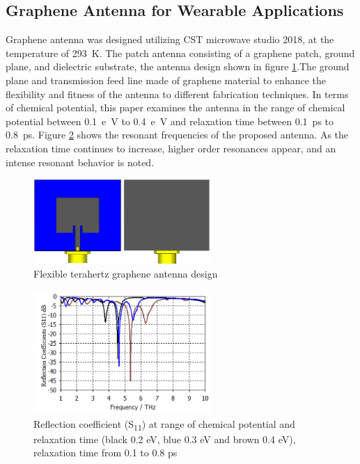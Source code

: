 \documentclass[12pt]{suhbook}
\begin{document}
\subsection{Graphene Antenna for Wearable Applications}
Graphene antenna was designed utilizing CST microwave studio \si{2018}, at the temperature of \SI{293}{\kelvin}. The patch antenna consisting of a graphene patch, ground plane, and dielectric substrate, the antenna design shown in figure \ref{Fig 1}.The ground plane and transmission feed line made of graphene material to enhance the flexibility and fitness of the antenna to different fabrication techniques. In terms of chemical potential, this paper examines the antenna in the range of chemical potential between \SI{0.1}{e \volt} to \SI{0.4}{e \volt} and relaxation time between \SI{0.1}{\pico \second } to \SI{0.8}{\pico \second }. Figure \ref{Fig 2} shows the resonant frequencies of the proposed antenna. As the relaxation time continues to increase, higher order resonances appear, and an intense resonant behavior is noted.
\begin{figure}[hbt!]
    \centering
    \includegraphics[width=0.6\textwidth]{1}
    \caption{Flexible terahertz graphene antenna design}
    \label{Fig 1}
\end{figure}
\begin{figure}[h]
    \centering
    \includegraphics[width=0.6\textwidth]{2}
    \caption{Reflection coefficient (\si{S_{11}}) at range of chemical potential and relaxation time (black 0.2 eV, blue 0.3 eV and brown 0.4 eV), relaxation time from 0.1 to 0.8 ps}
    \label{Fig 2}
\end{figure}
\end{document}
